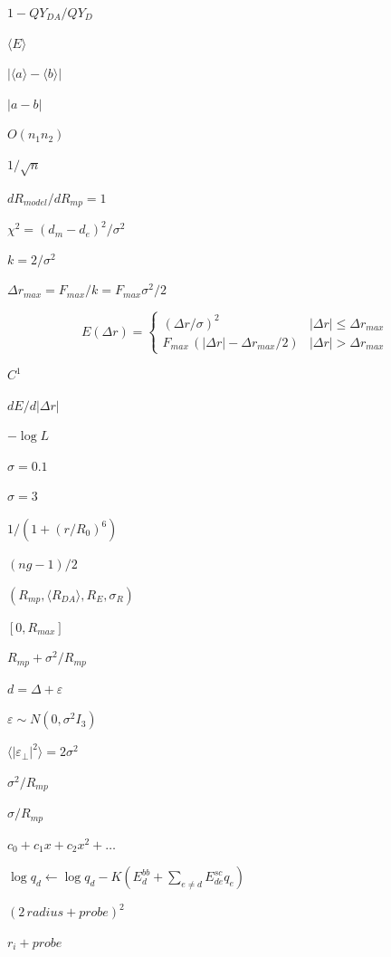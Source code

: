\documentclass{article}
\begin{document}
$1 - QY_{DA}/QY_D$
\pagebreak

$\langle E\rangle$
\pagebreak

$|\langle a\rangle - \langle b\rangle|$
\pagebreak

$|a - b|$
\pagebreak

$O(n_1 n_2)$
\pagebreak

$1/\sqrt{n}$
\pagebreak

$dR_{model}/dR_{mp} = 1$
\pagebreak

$\chi^2 = (d_m - d_e)^2 / \sigma^2$
\pagebreak

$k = 2/\sigma^2$
\pagebreak

$\Delta r_{max} = F_{max}/k = F_{max}\sigma^2/2$
\pagebreak

\[  E(\Delta r) = \begin{cases}
    (\Delta r/\sigma)^2                      & |\Delta r| \le \Delta r_{max}\\
    F_{max}\,(|\Delta r| - \Delta r_{max}/2) & |\Delta r| >  \Delta r_{max}
  \end{cases}
\]
\pagebreak

$C^1$
\pagebreak

$dE/d|\Delta r|$
\pagebreak

$-\log L$
\pagebreak

$\sigma = 0.1$
\pagebreak

$\sigma = 3$
\pagebreak

$1/(1 + (r/R_0)^6)$
\pagebreak

$(ng-1)/2$
\pagebreak

$(R_{mp}, \langle R_{DA}\rangle, R_E, \sigma_R)$
\pagebreak

$[0, R_{max}]$
\pagebreak

$R_{mp} + \sigma^2 / R_{mp}$
\pagebreak

$d = \Delta + \varepsilon$
\pagebreak

$\varepsilon \sim N(0, \sigma^2 I_3)$
\pagebreak

$\langle|\varepsilon_\perp|^2\rangle = 2\sigma^2$
\pagebreak

$\sigma^2/R_{mp}$
\pagebreak

$\sigma/R_{mp}$
\pagebreak

$c_0 + c_1 x + c_2 x^2 + \dots$
\pagebreak

$\log q_d \leftarrow \log q_d - K(E^{bb}_d + \sum_{e \neq d} E^{sc}_{de} q_e)$
\pagebreak

$(2\,radius + probe)^2$
\pagebreak

$r_i + probe$
\pagebreak
\end{document}
